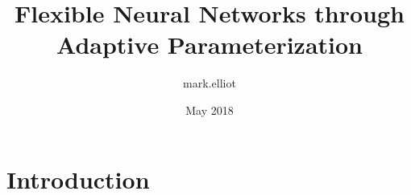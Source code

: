 \documentclass{article}
\title{Flexible Neural Networks through Adaptive Parameterization}
\author{mark.elliot }
\date{May 2018}
\begin{document}
\maketitle

\section{Introduction}
\end{document}

